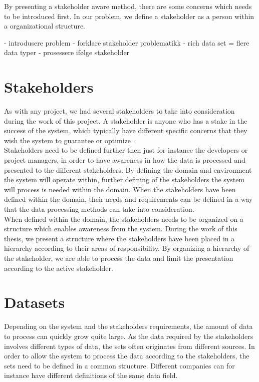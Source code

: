 By presenting a stakeholder aware method, there are some concerns which needs
to be introduced first. In our problem, we define a stakeholder as a person
within a organizational structure. 

- introdusere problem
- forklare stakeholder problematikk
- rich data set = flere data typer
- prosessere ifølge stakeholder


\section{Stakeholders} %
\label{sec:intro_stakeholders}  
As with any project, we had several stakeholders to take into consideration
during the work of this project. A stakeholder is anyone who has a stake in 
the success of the system, which typically have different specific concerns 
that they wish the system to guarantee or optimize 
\cite{Bass:2012:SAP:2392670}.\\

Stakeholders need to be defined further then just for instance the developers
or project managers, in order to have awareness in how the data is processed 
and presented to the different stakeholders. 
By defining the domain and environment the system will
operate within, further defining of the stakeholders the system will process 
is needed within the domain. When the stakeholders have been defined within 
the domain, their needs and requirements can be defined in a way that the data 
processing methods can take into consideration. \\

When defined within the domain, the stakeholders needs to be organized on a 
structure which enables awareness from the system. During the work of this 
thesis, we present a structure where the stakeholders have been placed in a 
hierarchy according to their areas of responsibility. By organizing a 
hierarchy of the stakeholder, we are able to process the data and limit the 
presentation according to the active stakeholder. 

\section{Datasets} %
\label{sec:intro_data_sets}
Depending on the system and the stakeholders requirements, the amount of data
to process can quickly grow quite large. As the data required by the
stakeholders involves different types of data, the sets often originates from
different sources. In order to allow the system to process the data according
to the stakeholders, the sets need to be defined in a common structure.
Different companies can for instance have different definitions of the same
data field.


